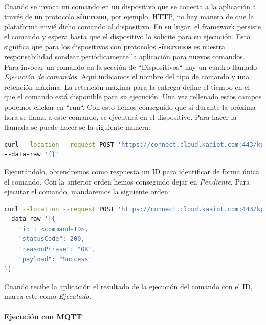 {Cuando se invoca un comando en un dispositivo que se conecta a la aplicación a través de un protocolo \textbf{síncrono}, por ejemplo, HTTP, no hay manera de que la plataforma envié dicho comando al dispositivo. En su lugar, el framework persiste el comando y espera hasta que el dispositivo lo solicite para su ejecución. Esto significa que para los dispositivos con protocolos \textbf{síncronos} es nuestra responsabilidad sondear periódicamente la aplicación para nuevos comandos. \\

Para invocar un comando en la sección de ``Dispositivos`` hay un cuadro llamado \textit{Ejecución de comandos}. Aquí indicamos el nombre del tipo de comando y una retención máxima. La retención máxima para la entrega define el tiempo en el que el comando está disponible para su ejecución. Una vez rellenado estos campos podemos clickar en ``run``. Con esto hemos conseguido que si durante la próxima hora se llama a este comando, se ejecutará en el dispositivo. Para hacer la llamada se puede hacer se la siguiente manera:

\begin{lstlisting}[language=bash]
curl --location --request POST 'https://connect.cloud.kaaiot.com:443/kp1/<app-version-name>/cex/<endpoint-token>/command/<command-name>' \
--data-raw '{}'
\end{lstlisting}

Ejecutándolo, obtendremos como respuesta un ID para identificar de forma única el comando. Con la anterior orden hemos conseguido dejar en \textit{Pendiente}. Para ejecutar el comando, mandaremos la siguiente orden:

\begin{lstlisting}[language=bash]
curl --location --request POST 'https://connect.cloud.kaaiot.com:443/kp1/<app-version-name>/cex/<endpoint-token>/result/<command-name>' \
--data-raw '[{
    "id": <command-ID>,
    "statusCode": 200,
    "reasonPhrase": "OK",
    "payload": "Success"
}]'
\end{lstlisting}

Cuando recibe la aplicación el resultado de la ejecución del comando con el ID, marca este como \textit{Ejecutado}.

\paragraph{Ejecución con MQTT}  \hspace{0pt} \\

}
